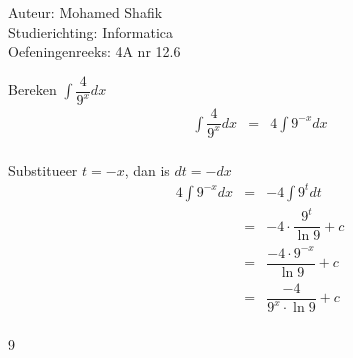 \documentclass[a4paper]{article}
\begin{document}
\noindent \large Auteur: Mohamed Shafik \\
\noindent \large Studierichting: Informatica\\
\noindent \large Oefeningenreeks: 4A nr 12.6\\

\medskip

\normalsize

Bereken $\displaystyle\int \dfrac{4}{9^x} dx$\\

\begin{eqnarray*}
\displaystyle\int \dfrac{4}{9^x} dx &=& 4 \displaystyle\int 9^{-x} dx\\
\end{eqnarray*}

Substitueer $t = -x$, dan is $dt = -dx$\\

\begin{eqnarray*}
4 \displaystyle\int 9^{-x} dx &=& -4 \displaystyle\int 9^t dt\\
&=& -4 \cdot \dfrac{9^t}{\ln 9} + c\\
&=& \dfrac{-4 \cdot 9^{-x}}{\ln 9} + c\\
&=& \dfrac{-4}{9^x \cdot \ln 9} + c\\
\end{eqnarray*}

\begin{thebibliography}{9}
\end{thebibliography}
\end{document}
